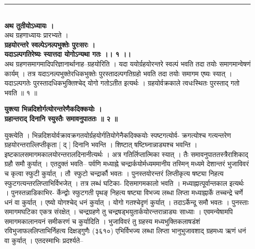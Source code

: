 \documentclass[11pt, openany]{book}
\begin{document}
{{{{\rule{0.2\linewidth}{1.0pt}\\

\vspace{4mm}
\centering
\textbf{
 अथ तुतीयोऽध्यायः ।}\\

\vspace{2mm}
अथ ग्रहणाध्यायः प्रारभ्यते ।\\

\vspace{2mm}
\textbf{
 ग्रहयोरन्तरे स्वल्पेऽनल्पभुक्तेः पुरःसरः ।\\
\hspace{1.8cm}
 यदाऽल्पगतिरेष्यः स्यात्तदा योगोऽन्यथा गतः ।। १ ।।}\\

\vspace{2mm}
\justifying
 अथ ग्रहणसमागमादिपरिज्ञानार्थानाह--ग्रहयोरिति । यदा
ययोर्ग्रहयोरन्तरे
स्वल्पं भवति तदा तयोः समागमान्वेषणं कार्यम् । तत्र
यदाऽनल्पभुक्तेरधिकभुक्तेः
पुरस्तादल्पगतिग्रहो भवति तदा तयोः समागम एष्यः स्यात् । यदाऽल्पगतेः
पुरस्तादधिकभुक्तिश्चेद्
योगो गतोऽतीत इत्यर्थः । ग्रहयोर्वक्रकाले
त्वधःस्थितः पुरस्ताद्
गतो भवति ॥ १ ॥

\vspace{2mm}
\centering
\textbf{
 युक्त्या भिन्नदिशोर्गत्योरन्तरेणैकदिक्कयोः ।\\
 \hspace{1.3cm}
 ग्रहान्तराद् दिनानि स्युस्तैः समावनुपाततः ॥ २ ॥}

\newpage
\thispagestyle{fancy}
\fancyhf{}
\lhead{[ग्रहणाधिकारः]}
\justifying
 युक्त्येति । भिन्नदिशयोर्वक्रावक्रगतयोर्ग्रहयोर्गतियोगेनैकदिक्कयोः
स्पष्टगत्योर्व-
क्रगत्योश्च गत्यन्तरेण ग्रहयोरन्तराल्लिप्तीकृता [ द् ] दिनानि
भवन्ति । शिष्टात्
षष्टिघ्नान्नाड्यश्च भवन्ति । इष्टकालसमागमकालयोरन्तरालदिनानीत्यर्थः
। अत्र
गतिर्लिप्तात्मिका स्यात् । तैः समावनुपाततस्त्रैराशिकाद् ग्रहौ समौ
कुर्यात् ।
एतदुक्तं भवति-- पर्वणि मध्याह्ने चन्द्रार्कयोर्मध्यममानीय तस्मिन्
मध्यमे देशान्तरं
भुजाविवरं च कृत्वा स्फुटी कुर्यात् । तौ स्फुटो चन्द्रार्कौ भवतः । 
पुनस्तयोरन्तरं
लिप्तीकृत्य षष्ट्या निहत्य स्फुटगत्यन्तरलिप्ताभिर्विभजेत् । तत्र
लब्धं घटिका-
दिसमागमकालो भवति । मध्याह्नात्पूर्वान्तकाल इत्यर्थः ।
पुनस्तन्नाडिकाभिर-
र्केन्द्वोः स्फुटगती पृथङ् निहत्य षष्ट्या विभज्य लब्धा लिप्ता
मध्याह्नार्के तच्चन्द्रे
चर्णे धनं वा कुर्यात् । एष्यो योगश्चेद् धनं कुर्यात् ।
योगो गतश्चेदृणं
कुर्यात् । तदाऽर्केन्दू समौ भवतः । पुनस्ताः समागमघटिका एकत्र संरक्षेत्
। चन्द्रग्रहणे
तु चन्द्रषड्भयुतार्कयोरन्तरान्नाड्यः साध्याः । एवमन्येषामपि
समागमकालानयनं
समीकरणं च कुर्यादिति । भुजाविवरं तु ग्रहस्य
मध्यभुक्तिकलाषडंशं
रविभुजाफललिप्ताभिर्निहत्य दिक्षड्गुणैः (३६१०) एभिर्विभज्य लब्धा लिप्ता
भानुभुजावशाद् ग्रहमध्य ऋणं धनं वा कुर्यात् । एतदस्माभिः
प्रदर्श्यते--

}}}}
\end{document}
